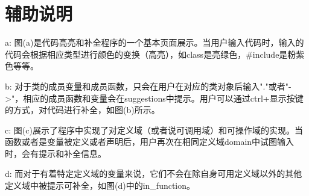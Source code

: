 \section{辅助说明}

a: 图(a)是代码高亮和补全程序的一个基本页面展示。当用户输入代码时，输入的代码会根据相应类型进行颜色的变换（高亮），如class是亮绿色，#include是粉紫色等等。

b: 对于类的成员变量和成员函数，只会在用户在对应的类对象后输入"."或者"->"，相应的成员函数和变量会在suggestions中提示。用户可以通过ctrl+显示按键的方式，对代码进行补全，如图(b)所示。

c: 图(c)展示了程序中实现了对定义域（或者说可调用域）和可操作域的实现。当函数或者是变量被定义或者声明后，用户再次在相同定义域domain中试图输入时，会有提示和补全信息。

d: 而对于有着特定定义域的变量来说，它们不会在除自身可用定义域以外的其他定义域中被提示可补全，如图(d)中的in_function。